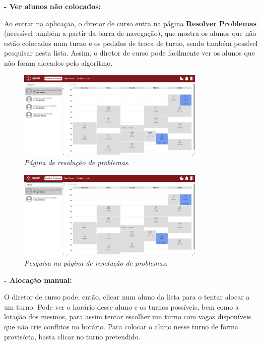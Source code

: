 \documentclass[12pt, a4paper]{article}
\begin{document}
\textbf{- Ver alunos não colocados:}

Ao entrar na aplicação, o diretor de curso entra na página \textbf{Resolver Problemas}
(acessível também a partir da barra de navegação), que mostra os alunos que não estão
colocados num turno e os pedidos de troca de turno, sendo também possível pesquisar
nesta lista. Assim, o diretor de curso pode facilmente ver os alunos que não
foram alocados pelo algoritmo.

\begin{figure}[H]
    \centering
    \includegraphics[width=0.8\textwidth]{res/manual/resolver_problemas.png}
    \caption{\emph{Página de resolução de problemas}.}
    \label{resolver_problemas}
\end{figure}

\begin{figure}[H]
    \centering
    \includegraphics[width=0.8\textwidth]{res/manual/resolver_problemas_pesquisar.png}
    \caption{\emph{Pesquisa na página de resolução de problemas}.}
    \label{resolver_problemas_pesquisa}
\end{figure}

\textbf{- Alocação manual:}

O diretor de curso pode, então, clicar num aluno da lista para o tentar alocar a um
turno. Pode ver o horário desse aluno e os turnos possíveis, bem como a lotação dos
mesmos, para assim tentar escolher um turno com vagas disponíveis que não crie conflitos
no horário. Para colocar o aluno nesse turno de forma provisória, basta clicar no turno pretendido.
\end{document}
